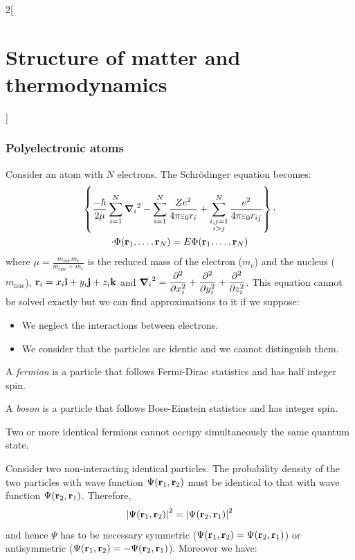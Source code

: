 \documentclass[../../../main.tex]{subfiles}
\begin{document}
\begin{multicols}{2}[\section{Structure of matter and thermodynamics}]
  \subsubsection{Polyelectronic atoms}
  \begin{prop}
    Consider an atom with $N$ electrons. The Schrödinger equation becomes:
    \begin{multline*}
      \left\{\frac{-\hbar}{2\mu}\sum_{i=1}^N{\grad_i}^2-\sum_{i=1}^N\frac{Ze^2}{4\pi\varepsilon_0r_i}+\sum_{\substack{i,j=1\\i>j}}^N\frac{e^2}{4\pi\varepsilon_0r_{ij}}\right\}\cdot\\\cdot\Phi(\boldsymbol{\mathrm{r}}_1,\ldots,\boldsymbol{\mathrm{r}}_N)=E\Phi(\boldsymbol{\mathrm{r}}_1,\ldots,\boldsymbol{\mathrm{r}}_N)
    \end{multline*}
    where $\displaystyle\mu=\frac{m_\text{nuc}m_e}{m_\text{nuc}+m_e}$ is the reduced mass of the electron ($m_e$) and the nucleus ($m_\text{nuc}$), $\boldsymbol{\mathrm{r}}_i=x_i\boldsymbol{\mathrm{i}}+y_i\boldsymbol{\mathrm{j}}+z_i\boldsymbol{\mathrm{k}}$ and $\displaystyle{\grad_i}^2=\pdv[2]{}{x_i}+\pdv[2]{}{y_i}+\pdv[2]{}{z_i}$.
    This equation cannot be solved exactly but we can find approximations to it if we suppose:
    \begin{itemize}
      \item We neglect the interactions between electrons.
      \item We consider that the particles are identic and we cannot distinguish them.
    \end{itemize}
  \end{prop}
  \begin{definition}[Fermions]
    A \textit{fermion} is a particle that follows Fermi-Dirac statistics and has half integer spin.
  \end{definition}
  \begin{definition}[Boson]
    A \textit{boson} is a particle that follows Bose-Einstein statistics and has integer spin.
  \end{definition}
  \begin{prop}
    Two or more identical fermions cannot occupy simultaneously the same quantum state.
  \end{prop}
  \begin{prop}
    Consider two non-interacting identical particles. The probability density of the two particles with wave function $\Psi(\boldsymbol{\mathrm{r}}_1,\boldsymbol{\mathrm{r}}_2)$ must be identical to that with wave function $\Psi(\boldsymbol{\mathrm{r}}_2,\boldsymbol{\mathrm{r}}_1)$. Therefore, $${|\Psi(\boldsymbol{\mathrm{r}}_1,\boldsymbol{\mathrm{r}}_2)|}^2={|\Psi(\boldsymbol{\mathrm{r}}_2,\boldsymbol{\mathrm{r}}_1)|}^2$$ and hence $\Psi$ has to be necessary symmetric ($\Psi(\boldsymbol{\mathrm{r}}_1,\boldsymbol{\mathrm{r}}_2)=\Psi(\boldsymbol{\mathrm{r}}_2,\boldsymbol{\mathrm{r}}_1)$) or antisymmetric ($\Psi(\boldsymbol{\mathrm{r}}_1,\boldsymbol{\mathrm{r}}_2)=-\Psi(\boldsymbol{\mathrm{r}}_2,\boldsymbol{\mathrm{r}}_1)$). Moreover we have:

\end{prop}
\end{multicols}
\end{document}
